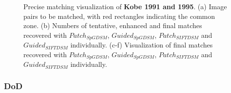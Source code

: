 \begin{figure}[htbp]
\begin{center}
{\begin{minipage}[t]{0.48\linewidth}
			\end{minipage}%
		}
		\caption{Precise matching visualization of \textbf{Kobe 1991 and 1995}. (a) Image pairs to be matched, with red rectangles indicating the common zone. (b) Numbers of tentative, enhanced and final matches recovered with $Patch_{SpGDSM}$, $Guided_{SpGDSM}$, $Patch_{SIFTDSM}$ and $Guided_{SIFTDSM}$ individually. (c-f) Visualization of final matches recovered with $Patch_{SpGDSM}$, $Guided_{SpGDSM}$, $Patch_{SIFTDSM}$ and $Guided_{SIFTDSM}$ individually.}
		\label{MatchVizKobe}
	\end{center}
\end{figure} 

\subsubsection{DoD}


